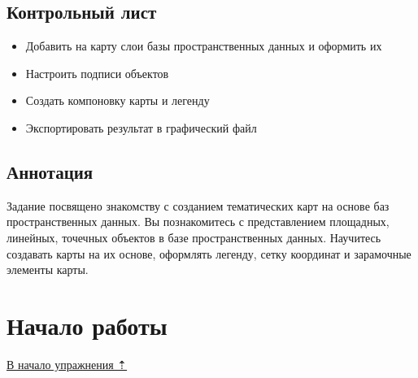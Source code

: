 \documentclass[]{book}
\providecommand{\tightlist}{%
  \setlength{\itemsep}{0pt}\setlength{\parskip}{0pt}}
\theoremstyle{definition}
\theoremstyle{definition}
\theoremstyle{definition}
\theoremstyle{remark}
\begin{document}
\hypertarget{map-design-general-control}{%
\subsection{Контрольный лист}\label{map-design-general-control}}

\begin{itemize}
\tightlist
\item
  Добавить на карту слои базы пространственных данных и оформить их
\item
  Настроить подписи объектов
\item
  Создать компоновку карты и легенду
\item
  Экспортировать результат в графический файл
\end{itemize}

\hypertarget{map-design-general-annotation}{%
\subsection{Аннотация}\label{map-design-general-annotation}}

Задание посвящено знакомству с созданием тематических карт на основе баз
пространственных данных. Вы познакомитесь с представлением площадных,
линейных, точечных объектов в базе пространственных данных. Научитесь
создавать карты на их основе, оформлять легенду, сетку координат и
зарамочные элементы карты.

\hypertarget{map-design-general-begin}{%
\section{Начало работы}\label{map-design-general-begin}}

\protect\hyperlink{map-design-general}{В начало упражнения ⇡}
\end{document}
